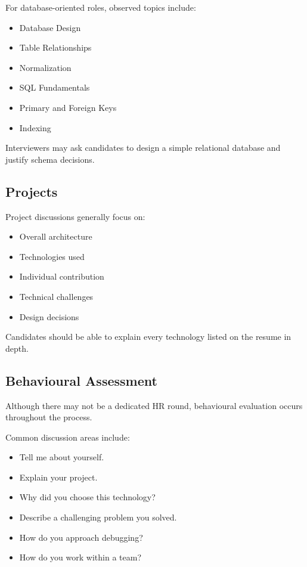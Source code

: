 \documentclass[11pt,a4paper]{article}
\begin{document}
For database-oriented roles, observed topics include:

\begin{itemize}
	\item Database Design
	\item Table Relationships
	\item Normalization
	\item SQL Fundamentals
	\item Primary and Foreign Keys
	\item Indexing
\end{itemize}

Interviewers may ask candidates to design a simple relational database and justify schema decisions.


\subsection{Projects}

Project discussions generally focus on:

\begin{itemize}
	\item Overall architecture
	\item Technologies used
	\item Individual contribution
	\item Technical challenges
	\item Design decisions
\end{itemize}

Candidates should be able to explain every technology listed on the resume in depth.


\subsection{Behavioural Assessment}

Although there may not be a dedicated HR round, behavioural evaluation occurs throughout the process.

Common discussion areas include:

\begin{itemize}
	\item Tell me about yourself.
	\item Explain your project.
	\item Why did you choose this technology?
	\item Describe a challenging problem you solved.
	\item How do you approach debugging?
	\item How do you work within a team?
\end{itemize}
\end{document}
